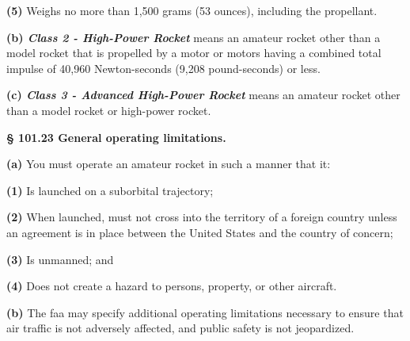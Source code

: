 \begin{adjustwidth}{0.5in}{0.0in}
\textbf{(5)} Weighs no more than 1,500 grams (53 ounces), including the propellant.\par

\end{adjustwidth}

\textbf{(b)\textit{ Class 2 - High-Power Rocket}} means an amateur rocket other than a model rocket that is propelled by a motor or motors having a combined total impulse of 40,960 Newton-seconds (9,208 pound-seconds) or less.\par

\textbf{(c)\textit{ Class 3 - Advanced High-Power Rocket}} means an amateur rocket other than a model rocket or high-power rocket.\par

\textbf{§ 101.23 General operating limitations.}\par

\textbf{(a)} You must operate an amateur rocket in such a manner that it:\par

\begin{adjustwidth}{0.5in}{0.0in}
\textbf{(1)} Is launched on a suborbital trajectory;\par

\end{adjustwidth}

\begin{adjustwidth}{0.5in}{0.0in}
\textbf{(2)} When launched, must not cross into the territory of a foreign country unless an agreement is in place between the United States and the country of concern;\par

\end{adjustwidth}

\begin{adjustwidth}{0.5in}{0.0in}
\textbf{(3)} Is unmanned; and\par

\end{adjustwidth}

\begin{adjustwidth}{0.5in}{0.0in}
\textbf{(4)} Does not create a hazard to persons, property, or other aircraft.\par

\end{adjustwidth}

\textbf{(b)} The \gls{faa} may specify additional operating limitations necessary to ensure that air traffic is not adversely affected, and public safety is not jeopardized.\par

